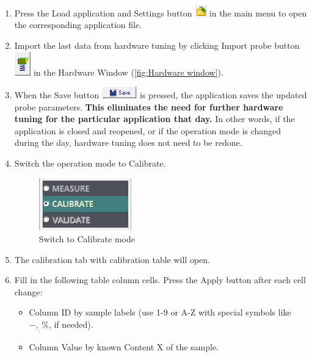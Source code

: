 \documentclass[a4paper,12pt]{article}
\begin{document}
\begin{enumerate}

\item Press the Load application and Settings button \includegraphics[height=0.5cm]{Btn_Open.png} in the main menu to open the corresponding application file.

\item Import the last data from hardware tuning by clicking Import probe button \includegraphics[width=0.7cm]{Settings_Import.png} in the Hardware Window (\cref{fig:Hardware window}).

\item When the Save button \includegraphics[height=0.5cm]{Settings_Ini_Save.png} is pressed, the application saves the updated probe parameters. \textbf{This eliminates the need for further hardware tuning for the particular application that day.} In other words, if the application is closed and reopened, or if the operation mode is changed during the day, hardware tuning does not need to be redone.

\item Switch the operation mode to Calibrate. 

\begin{figure}[!ht]
\centering
\includegraphics[width=4cm]{Calibrate_Switch.png}
\caption{Switch to Calibrate mode}
\label{fig:Calibrate_mode_switcher}
\end{figure}

\item The calibration tab with calibration table will open.

\item Fill in the following table column cells. Press the Apply button after each cell change:
    \begin{itemize}
        \item Column ID by sample labels (use 1-9 or A-Z with special symbols like $-,_,\%$, if needed).
        \item Column Value by known Content X of the sample.
    \end{itemize}



\end{enumerate}
\end{document}
